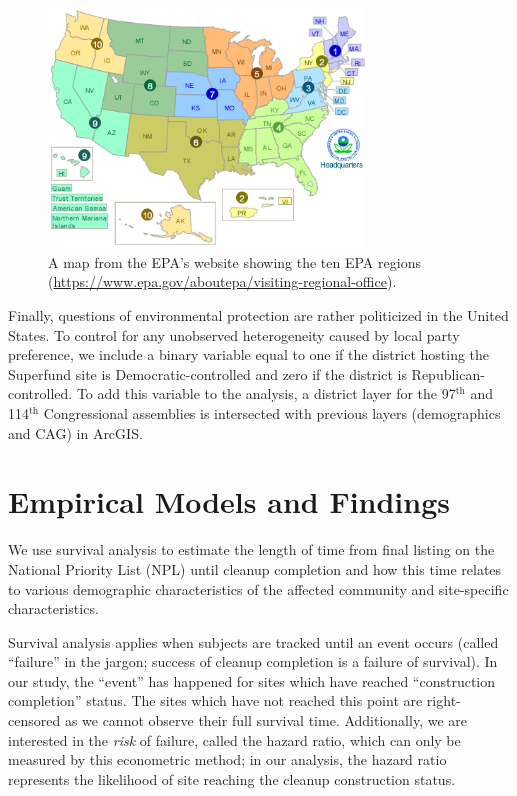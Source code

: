 \documentclass[12pt]{article}
\begin{document}
{ \begin{figure}[H] \centering
\includegraphics[width=0.75\textwidth]{us-regions.png}
\caption{\small A map from the EPA's website showing the ten EPA regions (\underline{https://www.epa.gov/aboutepa/visiting-regional-office}). \label{map}}
\end{figure}

Finally, questions of environmental protection are rather politicized in the United States. To control for any unobserved heterogeneity caused by local party preference, we include a binary variable equal to one if the district hosting the Superfund site is Democratic-controlled and zero if the district is Republican-controlled. To add this variable to the analysis, a district layer for the 97$^\mathrm{th}$ and 114$^\mathrm{th}$ Congressional assemblies is intersected with previous layers (demographics and CAG) in ArcGIS.

\section{Empirical Models and Findings}\label{metrics}

We use survival analysis to estimate the length of time from final listing on the National Priority List (NPL) until cleanup completion and how this time relates to various demographic characteristics of the affected community and site-specific characteristics.  
\newcommand{\comm}{\mathrm{CommunityChars}_i}

Survival analysis applies when subjects are tracked until an event occurs (called ``failure'' in the jargon; success of cleanup completion is a failure of survival). In our study, the ``event'' has happened for sites which have reached ``construction completion'' status. The sites which have not reached this point are right-censored as we cannot observe their full survival time. Additionally, we are interested in the {\it risk} of failure, called the hazard ratio, which can only be measured by this econometric method; in our analysis, the hazard ratio represents the likelihood of site reaching the cleanup construction status. 

}
\end{document}
